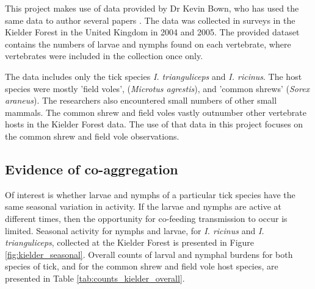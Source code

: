 \documentclass[hidelinks]{article}
\begin{document}
This project makes use of data provided by Dr Kevin Bown, who has used the same data to author several papers \citep{Bown2008, bown2009, Bown2011}. The data was collected in surveys in the Kielder Forest in the United Kingdom in 2004 and 2005. The provided dataset contains the numbers of larvae and nymphs found on each vertebrate, where vertebrates were included in the collection once only. 

The data includes only the tick species \textit{I. trianguliceps} and  \textit{I. ricinus}. The host species were mostly 'field voles', (\textit{Microtus agrestis}), and 'common shrews' (\textit{Sorex araneus}). The researchers also encountered small numbers of other small mammals. The common shrew and field voles vastly outnumber other vertebrate hosts in the Kielder Forest data. The use of that data in this project focuses on the common shrew and field vole observations. 

\subsection{Evidence of co-aggregation}

Of interest is whether larvae and nymphs of a particular tick species have the same seasonal variation in activity. If the larvae and nymphs are active at different times, then the opportunity for co-feeding transmission to occur is limited. Seasonal activity for nymphs and larvae, for \textit{I. ricinus} and \textit{I. trianguliceps}, collected at the Kielder Forest is presented in Figure \ref{fig:kielder_seasonal}. Overall counts of larval and nymphal burdens for both species of tick, and for the common shrew and field vole host species, are presented in Table \ref{tab:counts_kielder_overall}.
\end{document}

